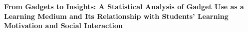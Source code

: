 \begin{center}
  {\large\bfseries From Gadgets to Insights: A Statistical Analysis of
  Gadget Use as a Learning Medium and Its Relationship with Students'
  Learning Motivation and Social Interaction\par}
  \vspace{0.75cm}
\end{center}
